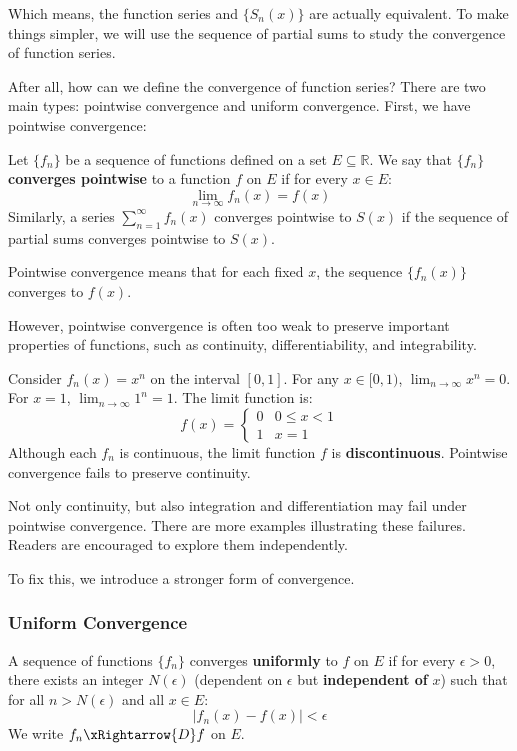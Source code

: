 \documentclass[oneside]{book}
\begin{document}
Which means, the function series and $\{S_n(x)\}$ are actually equivalent. To make things simpler, we will use the sequence of partial sums to study the convergence of function series.

After all, how can we define the convergence of function series? There are two main types: pointwise convergence and uniform convergence. First, we have pointwise convergence:

\begin{definition}
Let $\{f_n\}$ be a sequence of functions defined on a set $E \subseteq \mathbb{R}$. We say that $\{f_n\}$ \textbf{converges pointwise} to a function $f$ on $E$ if for every $x \in E$:
\[ \lim_{n \to \infty} f_n(x) = f(x) \]
Similarly, a series $\sum_{n=1}^{\infty} f_n(x)$ converges pointwise to $S(x)$ if the sequence of partial sums converges pointwise to $S(x)$.
\end{definition}

Pointwise convergence means that for each fixed $x$, the sequence $\{f_n(x)\}$ converges to $f(x)$.

However, pointwise convergence is often too weak to preserve important properties of functions, such as continuity, differentiability, and integrability.

\begin{example}
Consider $f_n(x) = x^n$ on the interval $[0, 1]$.
For any $x \in [0, 1)$, $\lim_{n \to \infty} x^n = 0$. For $x = 1$, $\lim_{n \to \infty} 1^n = 1$.
The limit function is:
\[ f(x) = \begin{cases} 0 & 0 \le x < 1 \\ 1 & x = 1 \end{cases} \]
Although each $f_n$ is continuous, the limit function $f$ is \textbf{discontinuous}. Pointwise convergence fails to preserve continuity.
\end{example}

Not only continuity, but also integration and differentiation may fail under pointwise convergence. There are more examples illustrating these failures. Readers are encouraged to explore them independently.

To fix this, we introduce a stronger form of convergence.

\subsubsection{Uniform Convergence}

\begin{definition}
A sequence of functions $\{f_n\}$ converges \textbf{uniformly} to $f$ on $E$ if for every $\epsilon > 0$, there exists an integer $N(\epsilon)$ (dependent on $\epsilon$ but \textbf{independent of} $x$) such that for all $n > N(\epsilon)$ and all $x \in E$:
\[ |f_n(x) - f(x)| < \epsilon \]
We write $f_n \xRightarrow{D} f$ on $E$.
\end{definition}
\end{document}
